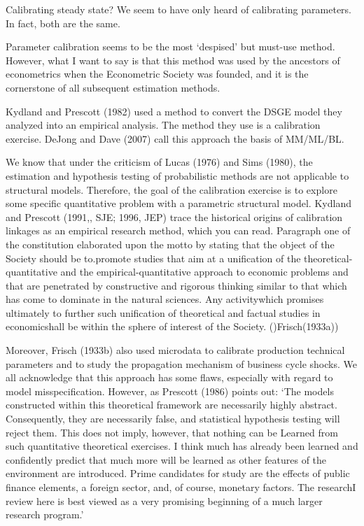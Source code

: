 \documentclass[10pt,math=newtx,citestyle=gb7714-2015,bibstyle=gb7714-2015]{elegantbook}
\begin{document}
	Calibrating steady state? We seem to have only heard of calibrating parameters. In fact, both are the same.
	
	Parameter calibration seems to be the most ‘despised’ but must-use method. However, what I want to say is that this method was used by the ancestors of econometrics when the Econometric Society was founded, and it is the cornerstone of all subsequent estimation methods.
	
	Kydland and Prescott (1982) used a method to convert the DSGE model they analyzed into an empirical analysis. The method they use is a calibration exercise. DeJong and Dave (2007) call this approach the basis of MM/ML/BL.
	
	We know that under the criticism of Lucas (1976) and Sims (1980), the estimation and hypothesis testing of probabilistic methods are not applicable to structural models. Therefore, the goal of the calibration exercise is to explore some specific quantitative problem with a parametric structural model. Kydland and Prescott (1991,, SJE; 1996, JEP) trace the historical origins of calibration linkages as an empirical research method, which you can read. Paragraph one of the constitution elaborated upon the motto by stating that the object of the Society should be to.promote studies that aim at a unification of the theoretical-quantitative and the empirical-quantitative approach to economic problems and that are penetrated by constructive and rigorous thinking similar to that which has come to dominate in the natural sciences. Any activitywhich promises ultimately to further such unification of theoretical and factual studies in economicshall be within the sphere of interest of the Society. ()Frisch(1933a))
	
	Moreover, Frisch (1933b) also used microdata to calibrate production technical parameters and to study the propagation mechanism of business cycle shocks. We all acknowledge that this approach has some flaws, especially with regard to model misspecification. However, as Prescott (1986) points out:
	‘The models constructed within this theoretical framework are necessarily highly abstract. Consequently, they are necessarily false, and statistical hypothesis testing will reject them. This does not imply, however, that nothing can be Learned from such quantitative theoretical exercises. I think much has already been learned and confidently predict that much more will be learned as other features of the environment are introduced. Prime candidates for study are the effects of public finance elements, a foreign sector, and, of course, monetary factors. The researchI review here is best viewed as a very promising beginning of a much larger research program.’
	
\end{document}
